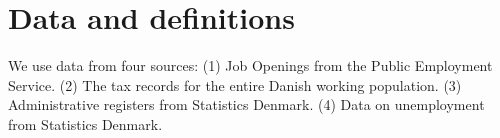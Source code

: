 \documentclass[11pt,article]{memoir}
\begin{document}
%




\FloatBarrier
\section{Data and definitions}
\label{sec:Data}
We use data from four  sources: (1) Job Openings from the Public Employment Service. (2) The tax records for the entire Danish working population. (3) Administrative registers from Statistics Denmark. (4) Data on unemployment from Statistics Denmark.
\end{document}

